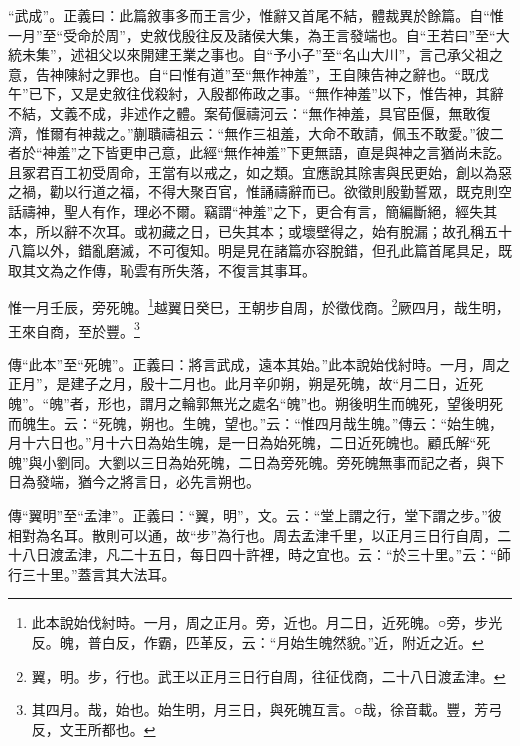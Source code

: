 {\noindent\shu{}\fzkt “武成”。正義曰：此篇敘事多而王言少，惟辭又首尾不結，體裁異於餘篇。自“惟一月”至“受命於周”，史敘伐殷往反及諸侯大集，為王言發端也。自“王若曰”至“大統未集”，述祖父以來開建王業之事也。自“予小子”至“名山大川”，言己承父祖之意，告神陳紂之罪也。自“曰惟有道”至“無作神羞”，王自陳告神之辭也。“既戊午”已下，又是史敘往伐殺紂，入殷都佈政之事。“無作神羞”以下，惟告神，其辭不結，文義不成，非述作之體。案荀偃禱河云：“無作神羞，具官臣偃，無敢復濟，惟爾有神裁之。”蒯聵禱祖云：“無作三祖羞，大命不敢請，佩玉不敢愛。”彼二者於“神羞”之下皆更申己意，此經“無作神羞”下更無語，直是與神之言猶尚未訖。且冢君百工初受周命，王當有以戒之，如之類。宜應說其除害與民更始，創以為惡之禍，勸以行道之福，不得大聚百官，惟誦禱辭而已。欲徵則殷勤誓眾，既克則空話禱神，聖人有作，理必不爾。竊謂“神羞”之下，更合有言，簡編斷絕，經失其本，所以辭不次耳。或初藏之日，已失其本；或壞壁得之，始有脫漏；故孔稱五十八篇以外，錯亂磨滅，不可復知。明是見在諸篇亦容脫錯，但孔此篇首尾具足，既取其文為之作傳，恥雲有所失落，不復言其事耳。 \par}

惟一月壬辰，旁死魄。\footnote{此本說始伐紂時。一月，周之正月。旁，近也。月二日，近死魄。○旁，步光反。魄，普白反，作霸，匹革反，云：“月始生魄然貌。”近，附近之近。}越翼日癸巳，王朝步自周，於徵伐商。\footnote{翼，明。步，行也。武王以正月三日行自周，往征伐商，二十八日渡孟津。}厥四月，哉生明，王來自商，至於豐。\footnote{其四月。哉，始也。始生明，月三日，與死魄互言。○哉，徐音載。豐，芳弓反，文王所都也。}


{\noindent\zhuan{}\fzbyks 傳“此本”至“死魄”。正義曰：將言武成，遠本其始。”此本說始伐紂時。一月，周之正月”，是建子之月，殷十二月也。此月辛卯朔，朔是死魄，故“月二日，近死魄”。“魄”者，形也，謂月之輪郭無光之處名“魄”也。朔後明生而魄死，望後明死而魄生。云：“死魄，朔也。生魄，望也。”云：“惟四月哉生魄。”傳云：“始生魄，月十六日也。”月十六日為始生魄，是一日為始死魄，二日近死魄也。顧氏解“死魄”與小劉同。大劉以三日為始死魄，二日為旁死魄。旁死魄無事而記之者，與下日為發端，猶今之將言日，必先言朔也。 \par}

{\noindent\zhuan{}\fzbyks 傳“翼明”至“孟津”。正義曰：“翼，明”，文。云：“堂上謂之行，堂下謂之步。”彼相對為名耳。散則可以通，故“步”為行也。周去孟津千里，以正月三日行自周，二十八日渡孟津，凡二十五日，每日四十許裡，時之宜也。云：“於三十里。”云：“師行三十里。”蓋言其大法耳。 \par}

